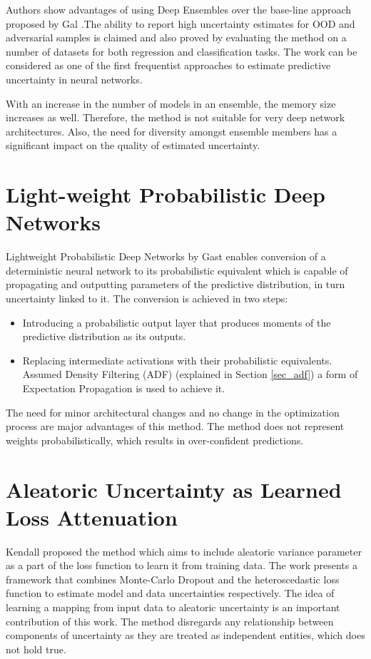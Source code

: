 	  Authors show advantages of using Deep Ensembles over the base-line approach proposed by Gal {\etal} \cite{gal2016dropout}.The ability to report high uncertainty estimates for OOD and adversarial samples is claimed and also proved by evaluating the method on a number of datasets for both regression and classification tasks. The work can be considered as one of the first frequentist approaches to estimate predictive uncertainty in neural networks.
	  
	  With an increase in the number of models in an ensemble, the memory size increases as well. Therefore, the method is not suitable for very deep network architectures. Also, the need for diversity amongst ensemble members has a significant impact on the quality of estimated uncertainty.  
	\section{Light-weight Probabilistic Deep Networks}
	 Lightweight Probabilistic Deep Networks \cite{gast2018lightweight} by Gast {\etal} enables conversion of a deterministic neural network to its probabilistic equivalent which is capable of propagating and outputting parameters of the predictive distribution, in turn uncertainty linked to it. The conversion is achieved in two steps: 
	 \begin{itemize}
	 \item Introducing a probabilistic output layer that produces moments of the predictive distribution as its outputs.
	 \item Replacing intermediate activations with their probabilistic equivalents. Assumed Density Filtering (ADF) (explained in Section \ref{sec_adf}) a form of Expectation Propagation is used to achieve it. 
	 \end{itemize}
	 
	 The need for minor architectural changes and no change in the optimization process are major advantages of this method. The method does not represent weights probabilistically, which results in over-confident predictions.
	  
	  
	\section{Aleatoric Uncertainty as Learned Loss Attenuation}
	Kendall {\etal} proposed the method \cite{kendall2017what} which aims to include aleatoric variance parameter as a part of the loss function to learn it from training data. The work presents a framework that combines Monte-Carlo Dropout \cite{gal2016dropout} and the heteroscedastic loss function to estimate model and data uncertainties respectively. The idea of learning a mapping from input data to aleatoric uncertainty is an important contribution of this work.
	The method disregards any relationship between components of uncertainty as they are treated as independent entities, which does not hold true.
